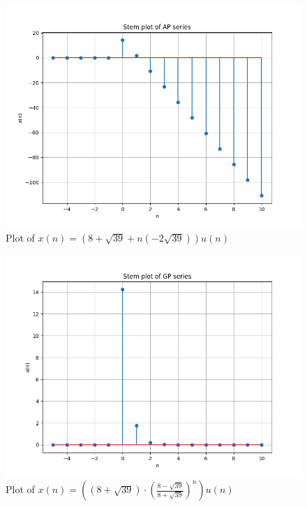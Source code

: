 \documentclass[journal,12pt,twocolumn]{IEEEtran}
\providecommand{\brak}[1]{\ensuremath{\left(#1\right)}}
\theoremstyle{remark}
\begin{document}
\begin{figure}[h!]
    \centering
    \includegraphics[width=\columnwidth]{figs/ap.png}
    \caption{Plot of $x\brak{n} = \brak{8+\sqrt{39} + n\brak{-2\sqrt{39}}}u\brak{n}$}
    \label{fig:2}
\end{figure}

\begin{figure}[h!]
    \centering
    \includegraphics[width=\columnwidth]{figs/gp.png}
    \caption{Plot of $x\brak{n} = \brak{\brak{8+\sqrt{39}}\cdot {\brak{\frac{8-\sqrt{39}}{8+\sqrt{39}}}}^{n}}u\brak{n}$}
    \label{fig:3}
\end{figure}
\end{document}
